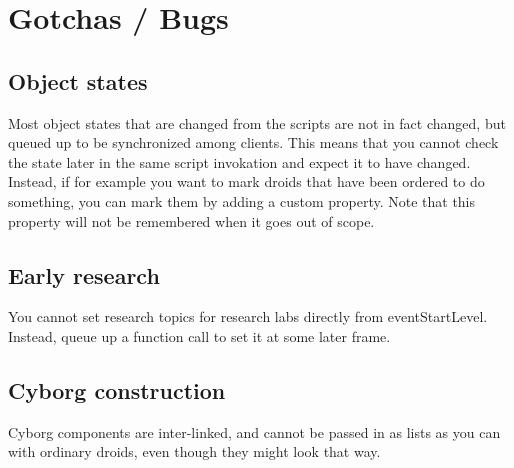 \documentclass[12pt]{article}
\begin{document}
\section{Gotchas / Bugs}

\subsection{Object states}
Most object states that are changed from the scripts are not in fact changed, but queued up to be synchronized
among clients. This means that you cannot check the state later in the same script invokation and expect it to
have changed. Instead, if for example you want to mark droids that have been ordered to do something, you can
mark them by adding a custom property. Note that this property will not be remembered when it goes out of scope.

\subsection{Early research}
You cannot set research topics for research labs directly from eventStartLevel. Instead, queue up a function
call to set it at some later frame.

\subsection{Cyborg construction}
Cyborg components are inter-linked, and cannot be passed in as lists as you can with ordinary droids, even
though they might look that way.
\end{document}
